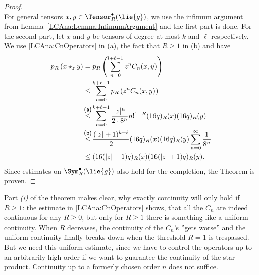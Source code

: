 \begin{proof}
\begin{equation*}
    \end{equation*}
    For general tensors $x,y \in \Tensor_R^{\bullet}(\lie{g})$, we use the 
    infimum argument from Lemma~\ref{LCAna:Lemma:InfimumArgument} and the 
    first part is done. For the second part, let $x$ and $y$
    be tensors of degree at most $k$ and $\ell$ respectively. We use
    \eqref{LCAna:CnOperators} in (a), the fact that $R \geq 1$ in (b) and have
    \begin{align}
	    \nonumber
	    	p_R \left(
	    	x \star_z y
	    	\right)
	    	& =
	    	p_R \left(
	    		\sum\limits_{n=0}^{l + \ell - 1}
	    		z^n C_n(x, y)
	    	\right)
	    	\\
	    \nonumber
	    	& \leq
	    	\sum\limits_{n=0}^{k + \ell - 1}
	    	p_R \left(
	    		z^n C_n(x, y)
	    	\right)
	    	\\
	    \label{LCAna:2MonomialEstimate}
	    	& \ot{(a)}{\leq}
	    	\sum\limits_{n=0}^{k + \ell - 1}
	    	\frac{|z|^n}{2 \cdot 8^n}
	    	n!^{1 - R}
	    	(16 q)_R(x)
	    	(16 q)_R(y)
	    	\\
	    \nonumber
	    	& \ot{(b)}{\leq}
	    	\frac{(|z| + 1)^{k + \ell}}{2}
	    	(16 q)_R(x)
	    	(16 q)_R(y)
	    	\sum\limits_{n = 0}^{\infty}
	    	\frac{1}{8^n}
			\\
		\nonumber
			& \leq
	    	(16(|z| + 1) q)_R(x)
	    	(16(|z| + 1) q)_R(y).
    \end{align}
    Since estimates on $\Sym_R^{\bullet}(\lie{g})$ also hold for the
    completion, the Theorem is proven.
\end{proof}
\begin{remark}
	Part \textit{(i)} of the theorem makes clear, why exactly continuity will 
	only hold if $R \geq 1$: the estimate in \eqref{LCAna:CnOperators} shows, 
	that all the 	$C_n$ are indeed continuous for any $R \geq 0$, but only 
	for $R \geq 1$ there is something like a uniform continuity. When $R$ 
	decreases, the continuity of the $C_n$'s ''gets worse'' and the uniform 
	continuity finally breaks down when the threshold $R = 1$ is trespassed. 
	But we need this uniform estimate, since we have to control the operators 
	up to an arbitrarily high order if we want to guarantee the continuity of 
	the star product. Continuity up to a formerly chosen order $n$ does not 
	suffice.
\end{remark}


